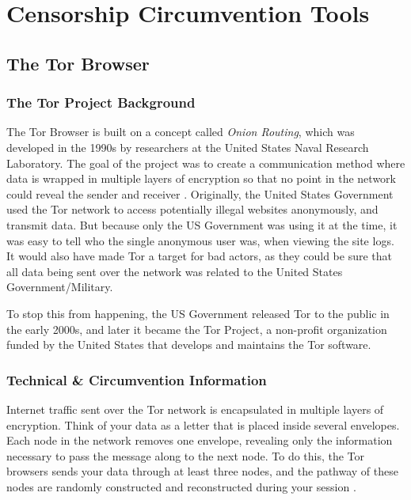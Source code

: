 \section{Censorship Circumvention Tools}

\subsection{The Tor Browser}

\subsubsection{The Tor Project Background}

The Tor Browser is built on a concept called \textit{Onion Routing}, which was developed in the 1990s by researchers at the United States Naval Research Laboratory. The goal of the project was to create a communication method where data is wrapped in multiple layers of encryption so that no point in the network could reveal the sender and receiver \cite{torprojectProjectPrivacy}. Originally, the United States Government used the Tor network to access potentially illegal websites anonymously, and transmit data. But because only the US Government was using it at the time, it was easy to tell who the single anonymous user was, when viewing the site logs. It would also have made Tor a target for bad actors, as they could be sure that all data being sent over the network was related to the United States Government/Military.

To stop this from happening, the US Government released Tor to the public in the early 2000s, and later it became the Tor Project, a non-profit organization funded by the United States that develops and maintains the Tor software. 

\subsubsection{Technical \& Circumvention Information}

Internet traffic sent over the Tor network is encapsulated in multiple layers of encryption. Think of your data as a letter that is placed inside several envelopes. Each node in the network removes one envelope, revealing only the information necessary to pass the message along to the next node. To do this, the Tor browsers sends your data through at least three nodes, and the pathway of these nodes are randomly constructed and reconstructed during your session \cite{dingledine2004tor}.

